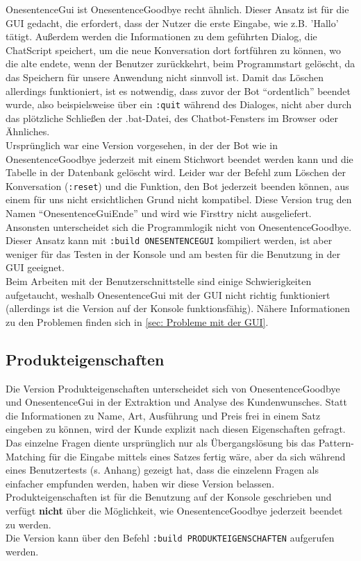 OnesentenceGui ist OnesentenceGoodbye recht ähnlich. Dieser Ansatz ist für die GUI gedacht, die erfordert, dass der Nutzer die erste Eingabe, wie z.B. 'Hallo' tätigt. Außerdem werden die Informationen zu dem geführten Dialog, die ChatScript speichert, um die neue Konversation dort fortführen zu können, wo die alte endete, wenn der Benutzer zurückkehrt, beim Programmstart gelöscht, da das Speichern für unsere Anwendung nicht sinnvoll ist. Damit das Löschen allerdings funktioniert, ist es notwendig, dass zuvor der Bot "`ordentlich"' beendet wurde, also beispielsweise über ein \lstinline|:quit| während des Dialoges, nicht aber durch das plötzliche Schließen der .bat-Datei, des Chatbot-Fensters im Browser oder Ähnliches.\\
Ursprünglich war eine Version vorgesehen, in der der Bot wie in OnesentenceGoodbye jederzeit mit einem Stichwort beendet werden kann und die Tabelle in der Datenbank gelöscht wird. Leider war der Befehl zum Löschen der Konversation (\lstinline|:reset|) und die Funktion, den Bot jederzeit beenden können, aus einem für uns nicht ersichtlichen Grund nicht kompatibel. Diese Version trug den Namen "`OnesentenceGuiEnde"' und wird wie Firsttry nicht ausgeliefert.\\
Ansonsten unterscheidet sich die Programmlogik nicht von OnesentenceGoodbye. Dieser Ansatz kann mit \lstinline|:build ONESENTENCEGUI| kompiliert werden, ist aber weniger für das Testen in der Konsole und am besten für die Benutzung in der GUI geeignet.\\
Beim Arbeiten mit der Benutzerschnittstelle sind einige Schwierigkeiten aufgetaucht, weshalb OnesentenceGui mit der GUI nicht richtig funktioniert (allerdings ist die Version auf der Konsole funktionsfähig). Nähere Informationen zu den Problemen finden sich in \ref{sec: Probleme mit der GUI}.\\

\subsection{Produkteigenschaften}
\label{sec:Produkteigenschaften}

Die Version Produkteigenschaften unterscheidet sich von OnesentenceGoodbye und OnesentenceGui in der Extraktion und Analyse des Kundenwunsches. Statt die Informationen zu Name, Art, Ausführung und Preis frei in einem Satz eingeben zu können, wird der Kunde explizit nach diesen Eigenschaften gefragt.\\
Das einzelne Fragen diente ursprünglich nur als Übergangslösung bis das Pattern-Matching für die Eingabe mittels eines Satzes fertig wäre, aber da sich während eines Benutzertests (s. Anhang) gezeigt hat, dass die einzelenn Fragen als einfacher empfunden werden, haben wir diese Version belassen.\\
Produkteigenschaften ist für die Benutzung auf der Konsole geschrieben und verfügt \textbf{nicht} über die Möglichkeit, wie OnesentenceGoodbye jederzeit beendet zu werden.\\
Die Version kann über den Befehl \lstinline|:build PRODUKTEIGENSCHAFTEN| aufgerufen werden.